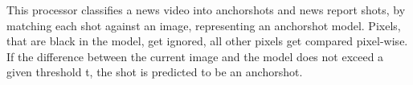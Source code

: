 This processor classifies a news video into anchorshots and news report shots, by matching each shot against an image, representing an anchorshot model. Pixels, that are black in the model, get ignored, all other pixels get compared pixel-wise. If the difference between the current image and the model does not exceed a given threshold t, the shot is predicted to be an anchorshot.